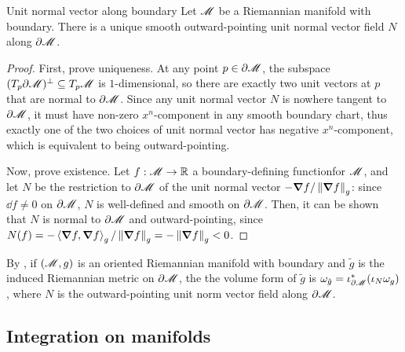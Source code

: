 \begin{proposition}{Unit normal vector along boundary}{}
  Let $ \mathscr{M} $ be a Riemannian manifold with boundary. There is a unique smooth outward-pointing unit normal vector field $ N $ along $ \partial \mathscr{M} $.
\end{proposition}

\begin{proofbox}
  \begin{proof}
    First, prove uniqueness. At any point $ p \in \partial \mathscr{M} $, the subspace $ (T_p \partial \mathscr{M})^\perp \subseteq T_p\mathscr{M} $ is $ 1 $-dimensional, so there are exactly two unit vectors at $ p $ that are normal to $ \partial \mathscr{M} $. Since any unit normal vector $ N $ is nowhere tangent to $ \partial \mathscr{M} $, it must have non-zero $ x^n $-component in any smooth boundary chart, thus exactly one of the two choices of unit normal vector has negative $ x^n $-component, which is equivalent to being outward-pointing.

    Now, prove existence. Let $ f : \mathscr{M} \rightarrow \mathbb{R} $ a boundary-defining function\footnotemark for $ \mathscr{M} $, and let $ N $ be the restriction to $ \partial \mathscr{M} $ of the unit normal vector $ - \boldsymbol{\nabla} f / \left\lVert\boldsymbol{\nabla} f\right\rVert_g $: since $ \dd f \neq 0 $ on $ \partial \mathscr{M} $, $ N $ is well-defined and smooth on $ \partial \mathscr{M} $. Then, it can be shown that $ N $ is normal to $ \partial \mathscr{M} $ and outward-pointing, since $ N(f) = - \braket{\boldsymbol{\nabla} f , \boldsymbol{\nabla} f}_g / \left\lVert\boldsymbol{\nabla} f\right\rVert_g = - \left\lVert\boldsymbol{\nabla} f\right\rVert_g < 0 $.
  \end{proof}
\end{proofbox}


By , if $ (\mathscr{M} , g) $ is an oriented Riemannian manifold with boundary and $ \tilde{g} $ is the induced Riemannian metric on $ \partial \mathscr{M} $, the the volume form of $ \tilde{g} $ is $ \omega_{\tilde{g}} = \iota_{\partial \mathscr{M}}^* (\iota_N \omega_g) $, where $ N $ is the outward-pointing unit norm vector field along $ \partial \mathscr{M} $.

\subsection{Integration on manifolds}

